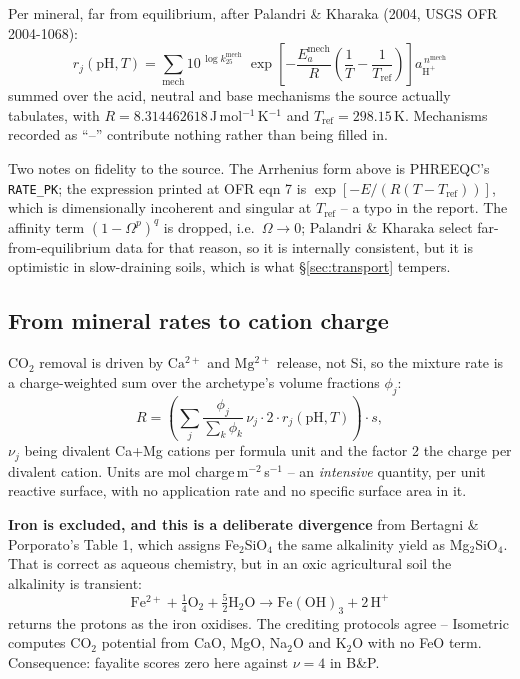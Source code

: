 \documentclass[11pt,a4paper]{article}
\newcommand{\cotwo}{\ensuremath{\mathrm{CO_2}}}
\newcommand{\ca}{\ensuremath{\mathrm{Ca^{2+}}}}
\newcommand{\mg}{\ensuremath{\mathrm{Mg^{2+}}}}
\begin{document}
Per mineral, far from equilibrium, after Palandri \& Kharaka (2004, USGS OFR
2004-1068):
\begin{equation}
r_j(\mathrm{pH},T) = \sum_{\mathrm{mech}}
  10^{\,\log k_{25}^{\mathrm{mech}}}\;
  \exp\!\left[-\frac{E_a^{\mathrm{mech}}}{R}
  \left(\frac{1}{T} - \frac{1}{T_{\mathrm{ref}}}\right)\right]
  a_{\mathrm{H^+}}^{\,n^{\mathrm{mech}}}
\end{equation}
summed over the acid, neutral and base mechanisms the source actually tabulates,
with $R = 8.314462618$\,J\,mol$^{-1}$\,K$^{-1}$ and
$T_{\mathrm{ref}} = 298.15$\,K. Mechanisms recorded as ``--'' contribute
nothing rather than being filled in.

Two notes on fidelity to the source. The Arrhenius form above is PHREEQC's
\texttt{RATE\_PK}; the expression printed at OFR eqn 7 is
$\exp[-E/(R(T-T_{\mathrm{ref}}))]$, which is dimensionally incoherent and
singular at $T_{\mathrm{ref}}$ -- a typo in the report. The affinity term
$(1-\Omega^p)^q$ is dropped, i.e.\ $\Omega \to 0$; Palandri \& Kharaka select
far-from-equilibrium data for that reason, so it is internally consistent, but it
is optimistic in slow-draining soils, which is what \S\ref{sec:transport} tempers.

\subsection{From mineral rates to cation charge}

\cotwo{} removal is driven by \ca{} and \mg{} release, not Si, so the mixture
rate is a charge-weighted sum over the archetype's volume fractions $\phi_j$:
\begin{equation}
R = \left(\sum_j \frac{\phi_j}{\sum_k \phi_k}\, \nu_j \cdot 2 \cdot
    r_j(\mathrm{pH},T)\right) \cdot s ,
\end{equation}
$\nu_j$ being divalent Ca+Mg cations per formula unit and the factor 2 the charge
per divalent cation. Units are mol charge\,m$^{-2}$\,s$^{-1}$ -- an
\emph{intensive} quantity, per unit reactive surface, with no application rate
and no specific surface area in it.

\textbf{Iron is excluded, and this is a deliberate divergence} from Bertagni \&
Porporato's Table 1, which assigns Fe$_2$SiO$_4$ the same alkalinity yield as
Mg$_2$SiO$_4$. That is correct as aqueous chemistry, but in an oxic agricultural
soil the alkalinity is transient:
\begin{equation}
\mathrm{Fe^{2+}} + \tfrac{1}{4}\mathrm{O_2} + \tfrac{5}{2}\mathrm{H_2O}
\longrightarrow \mathrm{Fe(OH)_3} + 2\,\mathrm{H^+}
\end{equation}
returns the protons as the iron oxidises. The crediting protocols agree --
Isometric computes \cotwo{} potential from CaO, MgO, Na$_2$O and K$_2$O with no
FeO term. Consequence: fayalite scores zero here against $\nu = 4$ in B\&P.
\end{document}
